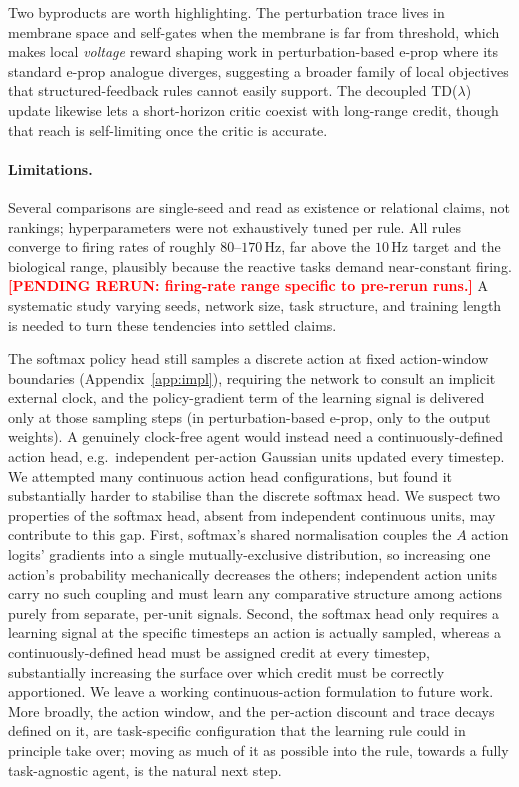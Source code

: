 \documentclass[10pt,twocolumn]{article}
\newcommand{\pending}[1]{\textcolor{red}{\bfseries[PENDING RERUN#1]}}
\newcommand{\method}{perturbation-based e-prop}   %
\begin{document}
Two byproducts are worth highlighting. The perturbation trace lives in membrane
space and self-gates when the membrane is far from threshold, which makes local
\emph{voltage} reward shaping work in \method{} where its standard
e-prop analogue diverges, suggesting a broader family of local objectives that
structured-feedback rules cannot easily support. The decoupled TD($\lambda$)
update likewise lets a short-horizon critic coexist with long-range credit,
though that reach is self-limiting once the critic is accurate.

\paragraph{Limitations.}
Several comparisons are single-seed and read as existence or relational
claims, not rankings; hyperparameters were not exhaustively tuned per rule.
All rules converge to firing rates of roughly $80$--$170$\,Hz, far above the
$10$\,Hz target and the biological range, plausibly because the reactive tasks
demand near-constant firing.\pending{: firing-rate range specific to
pre-rerun runs.} A systematic study
varying seeds, network size, task structure, and training length is needed to
turn these tendencies into settled claims.

The softmax policy head still
samples a discrete action at fixed action-window boundaries
(Appendix~\ref{app:impl}), requiring the network to consult an implicit
external clock, and the policy-gradient term of the learning signal is
delivered only at those sampling steps (in \method{}, only to the
output weights). A genuinely clock-free agent would instead need a
continuously-defined action head, e.g.\ independent per-action Gaussian units
updated every timestep. We attempted many continuous action head
configurations, but found it substantially harder to stabilise than the
discrete softmax head. We suspect two properties of the softmax head, absent from independent
continuous units, may contribute to this gap. First, softmax's shared
normalisation couples the $A$ action logits' gradients into a single
mutually-exclusive distribution, so increasing one action's probability
mechanically decreases the others; independent action units carry no such
coupling and must learn any comparative structure among actions purely from
separate, per-unit signals. Second, the softmax head only requires a learning
signal at the specific timesteps an action is actually sampled, whereas a
continuously-defined head must be assigned credit at every timestep,
substantially increasing the surface over which credit must be correctly
apportioned. We leave a working continuous-action formulation to future work.
More broadly, the action window, and the per-action discount and trace decays
defined on it, are task-specific configuration that the learning rule could in
principle take over; moving as much of it as possible into the rule, towards a
fully task-agnostic agent, is the natural next step.
\end{document}
